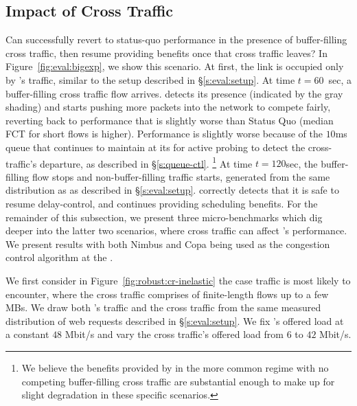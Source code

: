 \subsection{Impact of Cross Traffic}\label{s:robust:cross}



Can \name successfully revert to status-quo performance in the presence of buffer-filling cross traffic, then resume providing benefits once that cross traffic leaves?
In Figure~\ref{fig:eval:bigexp}, we show this scenario.
At first, the link is occupied only by \name's traffic, similar to the setup described in \S\ref{s:eval:setup}.
At time $t=60$~sec, a buffer-filling cross traffic flow arrives.
\name detects its presence (indicated by the gray shading) and starts pushing more packets into the network to compete fairly, reverting back to performance that is slightly worse than Status Quo (median FCT for short flows is \bigexpElasticSlowdownWorseness higher). 
Performance is slightly worse because of the $10$ms queue that \name continues to maintain at its \inbox for active probing to detect the cross-traffic's departure, as described in \S\ref{s:queue-ctl}.
\footnote{We believe the benefits provided by \name in the more common regime with no competing buffer-filling cross traffic are substantial enough to make up for slight degradation in these specific scenarios.}
At time $t=120$sec, the buffer-filling flow stops and non-buffer-filling traffic starts, generated from the same distribution as \name as described in \S\ref{s:eval:setup}.
\name correctly detects that it is safe to resume delay-control, and continues providing scheduling benefits.
For the remainder of this subsection, we present three micro-benchmarks which dig deeper into the latter two scenarios, where cross traffic can affect \name's performance. 
We present results with both Nimbus and Copa being used as the congestion control algorithm at the \inbox. 


We first consider in Figure~\ref{fig:robust:cr-inelastic} the case \name traffic is most likely to encounter, where the cross traffic comprises of finite-length flows up to a few MBs.
We draw both \name's traffic and the cross traffic from the same measured distribution of web requests described in \S\ref{s:eval:setup}.
We fix \name's offered load at a constant $48$ Mbit/s and vary the cross traffic's offered load from $6$ to $42$ Mbit/s.

